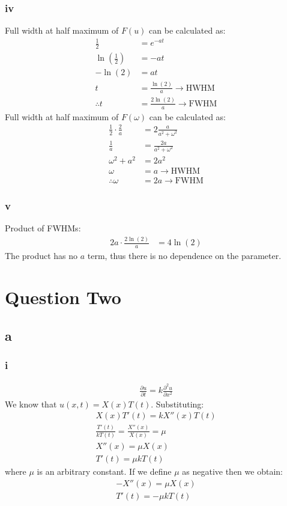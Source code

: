 \documentclass[11pt]{article}
\numberwithin{equation}{section}
\begin{document}
\subsubsection*{iv}
Full width at half maximum of $F\left(u\right)$ can be calculated as:
\begin{align}
	\frac{1}{2} &= e^{-at}\\
	\ln \left(\frac{1}{2}\right) &= -at\\
	-\ln \left(2\right) &= at\\
	t &= \frac{\ln \left( 2 \right)}{a} \rightarrow \textrm{HWHM}\\
	\therefore t &= \frac{2\ln \left( 2 \right)}{a} \rightarrow \textrm{FWHM}
\end{align}
Full width at half maximum of $F\left(\omega\right)$ can be calculated as:
\begin{align}
	\frac{1}{2}\cdot\frac{2}{a} &= 2\frac{a}{a^2 + \omega^2}\\
	\frac{1}{a} &= \frac{2a}{a^2 + \omega^2}\\
	\omega^2 + a^2 &= 2a^2\\
	\omega &= a \rightarrow \textrm{HWHM}\\
	\therefore \omega &= 2a \rightarrow \textrm{FWHM}
\end{align}
\subsubsection*{v}
Product of FWHMs:
\begin{align}
	2a\cdot \frac{2\ln\left(2\right)}{a} &= 4\ln\left(2\right)
\end{align}
The product has no $a$ term, thus there is no dependence on the parameter.
\section{Question Two}
\subsection*{a}
\subsubsection*{i}
\begin{align}
	\frac{\partial u}{\partial t} = k \frac{\partial^2 u}{\partial x^2}\label{PDEq2ai}
\end{align}
We know that $u(x,t) = X(x)T(t)$. Substituting:
\begin{gather}
	X\left(x\right) T'\left(t\right) = kX''\left(x\right)T\left(t\right)\\
	\frac{T'\left(t\right)}{kT\left(t\right)} = \frac{X''\left(x\right)}{X\left(x\right)} = \mu \\
	X''\left(x\right) = \mu X\left(x\right)\\
	T'\left(t\right) = \mu k T\left(t\right)
\end{gather}
where $\mu$ is an arbitrary constant. If we define $\mu$ as negative then we obtain:
\begin{align}
	-X''\left(x\right) = \mu X\left(x\right)\\
	T'\left(t\right) = -\mu k T\left(t\right)
\end{align}
\end{document}
